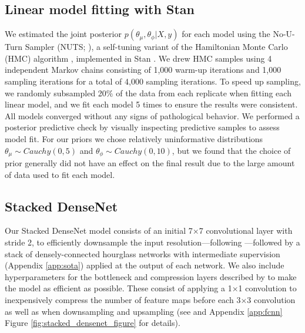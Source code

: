 \documentclass[11pt,a4paper,oneside]{article}
\begin{document}
\begin{appendices}
\subsection{Linear model fitting with Stan}
We estimated the joint posterior $p(\theta_{\mu},\theta_{\phi}|X,y)$ for each model using the No-U-Turn Sampler (NUTS; \citealt{hoffman2014nuts}), a self-tuning variant of the Hamiltonian Monte Carlo (HMC) algorithm \citep{duane1987hybrid}, implemented in Stan \citep{Carpenter_stan:a}. We drew HMC samples using 4 independent Markov chains consisting of 1,000 warm-up iterations and 1,000 sampling iterations for a total of 4,000 sampling iterations. To speed up sampling, we randomly subsampled 20$\%$ of the data from each replicate when fitting each linear model, and we fit each model 5 times to ensure the results were consistent. All models converged without any signs of pathological behavior. We performed a posterior predictive check by visually inspecting predictive samples to assess model fit. For our priors we chose relatively uninformative distributions $\theta_{\mu} \sim \mathit{Cauchy}(0, 5)$ and $\theta_{\phi} \sim \mathit{Cauchy}(0, 10)$, but we found that the choice of prior generally did not have an effect on the final result due to the large amount of data used to fit each model.



\label{app:implementation}

\subsection{Stacked DenseNet}
Our Stacked DenseNet model consists of an initial 7$\times$7 convolutional layer with stride 2, to efficiently downsample the input resolution—following \cite{newell2016}—followed by a stack of densely-connected hourglass networks with intermediate supervision (Appendix \ref{app:sota}) applied at the output of each network. We also include hyperparameters for the bottleneck and compression layers described by \cite{huang2017densely} to make the model as efficient as possible. These consist of applying a 1$\times$1 convolution to inexpensively compress the number of feature maps before each 3$\times$3 convolution as well as when downsampling and upsampling (see \citealt{huang2017densely} and Appendix \ref{app:fcnn} Figure \ref{fig:stacked_densenet_figure} for details).


\end{appendices}
\end{document}
